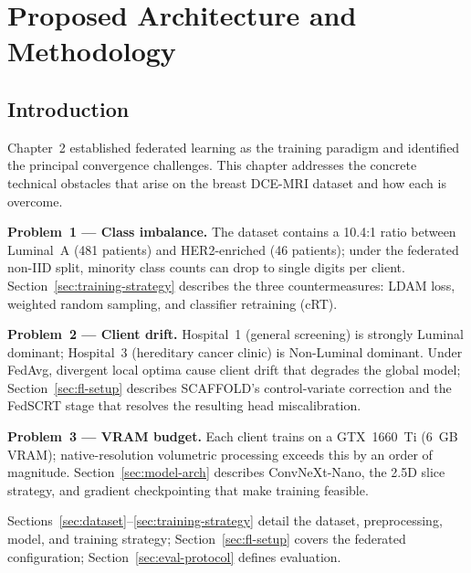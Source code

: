\chapter{Proposed Architecture and Methodology}
\label{chap:methodology}


\section{Introduction}
\label{sec:ch3-intro}

Chapter~2 established federated learning as the training paradigm and identified
the principal convergence challenges.
This chapter addresses the concrete technical obstacles that arise on the breast
DCE-MRI dataset and how each is overcome.

\textbf{Problem~1 --- Class imbalance.}
The dataset contains a 10.4:1 ratio between Luminal~A (481 patients) and
HER2-enriched (46 patients); under the federated non-IID split, minority class
counts can drop to single digits per client.
Section~\ref{sec:training-strategy} describes the three countermeasures:
LDAM loss, weighted random sampling, and classifier retraining (cRT).

\textbf{Problem~2 --- Client drift.}
Hospital~1 (general screening) is strongly Luminal dominant; Hospital~3
(hereditary cancer clinic) is Non-Luminal dominant.
Under FedAvg, divergent local optima cause client drift that degrades the global
model; Section~\ref{sec:fl-setup} describes SCAFFOLD's control-variate correction
and the FedSCRT stage that resolves the resulting head miscalibration.

\textbf{Problem~3 --- VRAM budget.}
Each client trains on a GTX~1660~Ti (6~GB VRAM); native-resolution volumetric
processing exceeds this by an order of magnitude.
Section~\ref{sec:model-arch} describes ConvNeXt-Nano, the 2.5D slice strategy,
and gradient checkpointing that make training feasible.

Sections~\ref{sec:dataset}--\ref{sec:training-strategy} detail the dataset,
preprocessing, model, and training strategy; Section~\ref{sec:fl-setup} covers
the federated configuration; Section~\ref{sec:eval-protocol} defines evaluation.



